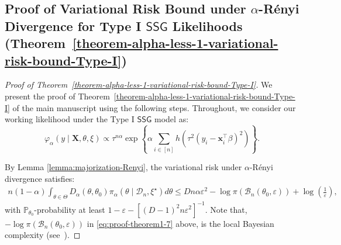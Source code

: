 \documentclass[12pt]{article}
\numberwithin{equation}{section}
\begin{document}
\subsection{Proof of Variational Risk Bound under \texorpdfstring{$\alpha$-R\'{e}nyi}{alpha-Renyi} Divergence for Type I \texorpdfstring{$\mathsf{SSG}$}{SSG} Likelihoods (\texorpdfstring{Theorem~\ref{theorem-alpha-less-1-variational-risk-bound-Type-I}}{Theorem 3})}\label{app:proof-theorem-vb-alpha-less-1-type-1}


\begin{proof}[Proof of Theorem~\ref{theorem-alpha-less-1-variational-risk-bound-Type-I}]
We present the proof of Theorem~\ref{theorem-alpha-less-1-variational-risk-bound-Type-I} of the main manuscript using the following steps. Throughout, we consider our working likelihood under the Type I $\mathsf{SSG}$ model as:
$$\varphi_{\alpha}(y\mid \mathbf{X}, \theta, \xi) \propto \tau^{n\alpha}\exp\left\{\alpha\sum_{i \in [n]}h(\tau^2(y_i - \mathbf{x}_i^{\top}\beta)^{2})\right\}.$$


By Lemma \ref{lemma:majorization-Renyi}, the variational risk under $\alpha$-R\'{e}nyi divergence satisfies:
\begin{align}\label{eq:proof-theorem1-7}
        n(1-\alpha)\int_{\theta\in \Theta}D_{\alpha}(\theta, \theta_{0})\pi_{\alpha}(\theta \mid \mathcal{D}_n, \xi^{\star})d\theta
        \leq Dn\alpha\varepsilon^2 - \log \pi(\mathcal{B}_n(\theta_0, \varepsilon)) + \log\left(\frac{1}{\varepsilon}\right),
\end{align}
with $\mathbb{P}_{\theta_0}$-probability at least $1-\varepsilon-[(D-1)^2n\varepsilon^2]^{-1}$. Note that, $-\log \pi(\mathcal{B}_n(\theta_0, \varepsilon))$ in \eqref{eq:proof-theorem1-7} above, is the local Bayesian complexity (see~\cite{Bayesian-fractional-posterior}).


\end{proof}
\end{document}
